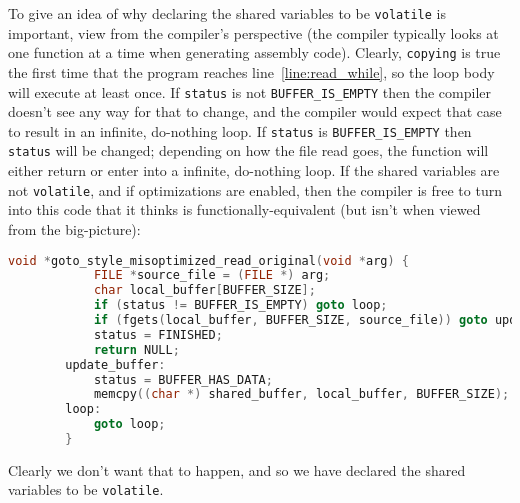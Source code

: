     To give an idea of why declaring the shared variables to be \lstinline{volatile} is important, view  from the compiler's perspective (the compiler typically looks at one function at a time when generating assembly code).
    Clearly, \lstinline{copying} is true the first time that the program reaches line~\ref{line:read_while}, so the loop body will execute at least once.
    If \lstinline{status} is not \lstinline{BUFFER_IS_EMPTY} then the compiler doesn't see any way for that to change, and the compiler would expect that case to result in an infinite, do-nothing loop.
    If \lstinline{status} is \lstinline{BUFFER_IS_EMPTY} then \lstinline{status} will be changed;
    depending on how the file read goes, the function will either return or enter into a infinite, do-nothing loop.
    If the shared variables are not \lstinline{volatile}, and if optimizations are enabled, then the compiler is free to turn  into this code that it thinks is functionally-equivalent (but isn't when viewed from the big-picture):

    \begin{lstlisting}[language=c, numbers=none, basicstyle=\small\ttfamily]
        void *goto_style_misoptimized_read_original(void *arg) {
            FILE *source_file = (FILE *) arg;
            char local_buffer[BUFFER_SIZE];
            if (status != BUFFER_IS_EMPTY) goto loop;
            if (fgets(local_buffer, BUFFER_SIZE, source_file)) goto update_buffer;
            status = FINISHED;
            return NULL;
        update_buffer:
            status = BUFFER_HAS_DATA;
            memcpy((char *) shared_buffer, local_buffer, BUFFER_SIZE);
        loop:
            goto loop;
        }
    \end{lstlisting}

    Clearly we don't want that to happen, and so we have declared the shared variables to be \lstinline{volatile}.%


